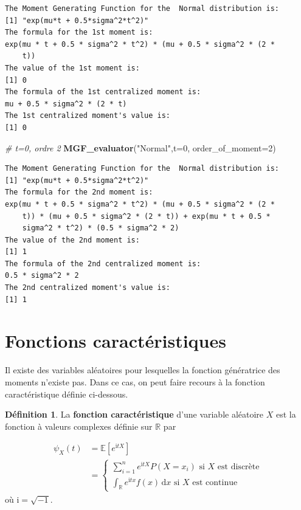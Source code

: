\documentclass[
]{book}
\newenvironment{Shaded}{\begin{snugshade}}{\end{snugshade}}
\newcommand{\CommentTok}[1]{\textcolor[rgb]{0.56,0.35,0.01}{\textit{#1}}}
\newcommand{\DataTypeTok}[1]{\textcolor[rgb]{0.13,0.29,0.53}{#1}}
\newcommand{\DecValTok}[1]{\textcolor[rgb]{0.00,0.00,0.81}{#1}}
\newcommand{\KeywordTok}[1]{\textcolor[rgb]{0.13,0.29,0.53}{\textbf{#1}}}
\newcommand{\NormalTok}[1]{#1}
\newcommand{\StringTok}[1]{\textcolor[rgb]{0.31,0.60,0.02}{#1}}
\theoremstyle{definition}
\newtheorem{definition}{Définition}[chapter]
\theoremstyle{definition}
\theoremstyle{definition}
\theoremstyle{remark}
\begin{document}
\begin{verbatim}
The Moment Generating Function for the  Normal distribution is: 
[1] "exp(mu*t + 0.5*sigma^2*t^2)"
The formula for the 1st moment is: 
exp(mu * t + 0.5 * sigma^2 * t^2) * (mu + 0.5 * sigma^2 * (2 * 
    t))
The value of the 1st moment is: 
[1] 0
The formula of the 1st centralized moment is: 
mu + 0.5 * sigma^2 * (2 * t)
The 1st centralized moment's value is: 
[1] 0
\end{verbatim}

\begin{Shaded}
\begin{Highlighting}[]
\CommentTok{# t=0, ordre 2}
\KeywordTok{MGF_evaluator}\NormalTok{(}\StringTok{"Normal"}\NormalTok{,}\DataTypeTok{t=}\DecValTok{0}\NormalTok{, }\DataTypeTok{order_of_moment=}\DecValTok{2}\NormalTok{)}
\end{Highlighting}
\end{Shaded}

\begin{verbatim}
The Moment Generating Function for the  Normal distribution is: 
[1] "exp(mu*t + 0.5*sigma^2*t^2)"
The formula for the 2nd moment is: 
exp(mu * t + 0.5 * sigma^2 * t^2) * (mu + 0.5 * sigma^2 * (2 * 
    t)) * (mu + 0.5 * sigma^2 * (2 * t)) + exp(mu * t + 0.5 * 
    sigma^2 * t^2) * (0.5 * sigma^2 * 2)
The value of the 2nd moment is: 
[1] 1
The formula of the 2nd centralized moment is: 
0.5 * sigma^2 * 2
The 2nd centralized moment's value is: 
[1] 1
\end{verbatim}

\hypertarget{fonctions-caractuxe9ristiques}{%
\section{Fonctions caractéristiques}\label{fonctions-caractuxe9ristiques}}

Il existe des variables aléatoires pour lesquelles la fonction génératrice des moments n'existe pas. Dans ce cas, on peut faire recours à la fonction caractéristique définie ci-dessous.
\begin{definition}
\protect\hypertarget{def:unnamed-chunk-16}{}{\label{def:unnamed-chunk-16} }La \textbf{fonction caractéristique} d'une variable aléatoire \(X\) est la fonction à valeurs complexes définie sur \(\mathbb {R}\) par

\begin{align*}\psi_{X}(t)&=\mathbb{E} \left[{e} ^{\mathrm{i} tX}\right]\\
&=\begin{cases}
\displaystyle \sum_{i=1}^n {e} ^{\mathrm{i} tX }P(X=x_i) \text{ si } X \text{ est discrète}\\
\displaystyle \int_{\mathbb{R} }e^{\mathrm{i} tx} f(x)\,\mathrm{d} x \text{ si } X \text{ est continue}
\end{cases}
\end{align*}
où \(\mathrm{i}=\sqrt{-1}\).
\end{definition}
\end{document}
